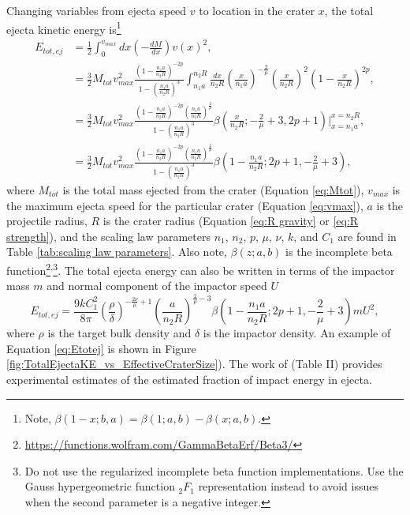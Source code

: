 \documentclass{article}
\begin{document}
Changing variables from ejecta speed $v$ to location in the crater $x$, the total ejecta kinetic energy is\footnote{Note, $\beta(1-x; b, a) = \beta(1; a, b) - \beta(x; a, b)$.}
\begin{align}
E_{tot,ej} &= \frac{1}{2}\int_{0}^{v_{max}}dx \left(-\frac{dM}{dx}\right)v(x)^2,\\\nonumber
&= \frac{3}{2}M_{tot}v_{max}^2\frac{\left(1-\frac{n_1 a}{n_2 R}\right)^{-2p}}{1-\left(\frac{n_1 a}{n_2 R}\right)^3}
\int_{n_1 a}^{n_2 R}
\frac{dx}{n_2 R}\left(\frac{x}{n_1 a}\right)^{-\frac{2}{\mu}}\left(\frac{x}{n_2 R}\right)^2\left(1-\frac{x}{n_2 R}\right)^{2p},\\\nonumber
& = \frac{3}{2}M_{tot}v_{max}^2\frac{\left(1-\frac{n_1 a}{n_2 R}\right)^{-2p}\left(\frac{n_1 a}{n_2 R}\right)^{\frac{2}{\mu}}}{1-\left(\frac{n_1 a}{n_2 R}\right)^3}
\beta\left(\frac{x}{n_2 R}; -\frac{2}{\mu}+3, 2p+1\right)\bigg\rvert^{x=n_2 R}_{x=n_1 a},\\
&=\frac{3}{2}M_{tot}v_{max}^2\frac{\left(1-\frac{n_1 a}{n_2 R}\right)^{-2p}\left(\frac{n_1 a}{n_2 R}\right)^{\frac{2}{\mu}}}{1-\left(\frac{n_1 a}{n_2 R}\right)^3}
\beta\left(1-\frac{n_1 a}{n_2 R}; 2p+1, -\frac{2}{\mu}+3\right),
\end{align}
where $M_{tot}$ is the total mass ejected from the crater (Equation \eqref{eq:Mtot}), $v_{max}$ is the maximum ejecta speed for the particular crater (Equation \eqref{eq:vmax}), $a$ is the projectile radius, $R$ is the crater radius (Equation \eqref{eq:R gravity} or \eqref{eq:R strength}), and the scaling law parameters $n_1$, $n_2$, $p$, $\mu$, $\nu$, $k$, and $C_1$ are found in Table \ref{tab:scaling law parameters}. Also note, $\beta(z; a, b)$ is the incomplete beta function\footnote{\href{https://functions.wolfram.com/GammaBetaErf/Beta3/}{https://functions.wolfram.com/GammaBetaErf/Beta3/}}\textsuperscript{,}\footnote{Do not use the regularized incomplete beta function implementations. Use the Gauss hypergeometric function $_2F_1$ representation instead to avoid issues when the second parameter is a negative integer.}.
The total ejecta energy can also be written in terms of the impactor mass $m$ and normal component of the impactor speed $U$ 
\begin{equation}\label{eq:Etotej}
E_{tot,ej} = \frac{9kC_1^2}{8\pi}\left(\frac{\rho}{\delta}\right)^{-\frac{2\nu}{\mu}+1}\left(\frac{a}{n_2 R}\right)^{\frac{2}{\mu}-3}
\beta\left(1-\frac{n_1 a}{n_2 R}; 2p+1, -\frac{2}{\mu}+3\right)
mU^2,
\end{equation}
where $\rho$ is the target bulk density and $\delta$ is the impactor density. An example of Equation \eqref{eq:Etotej} is shown in Figure \ref{fig:TotalEjectaKE_vs_EffectiveCraterSize}). The work of \cite{hartmann1985impact} (Table II) provides experimental estimates of the estimated fraction of impact energy in ejecta.
\end{document}
